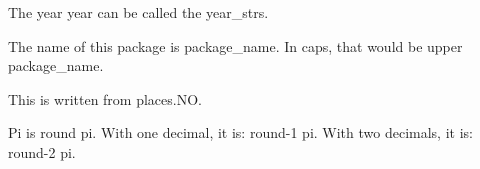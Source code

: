 \documentclass{article}
\begin{document}
The year {{year}} can be called the {{year_str}}s.

The name of this package is {{package_name}}.
In caps, that would be {{upper package_name}}.

This is written from {{places.NO}}.

Pi is {{round pi}}.
With one decimal, it is: {{round-1 pi}}.
With two decimals, it is: {{round-2 pi}}.
\end{document}
